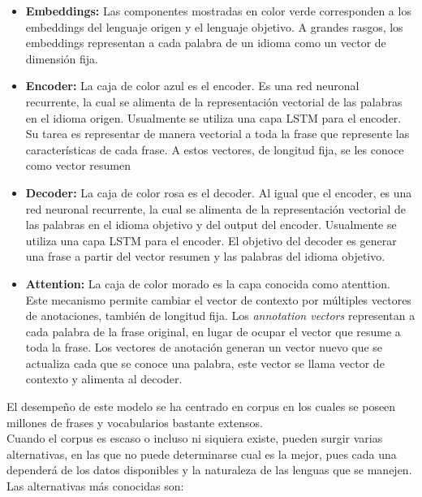 \documentclass[12pt,twocolumn, letterpaper]{article}
\begin{document}
\begin{itemize}
\item \textbf{Embeddings:} Las componentes mostradas en color verde corresponden a los embeddings del lenguaje origen y el lenguaje objetivo. A grandes rasgos, los embeddings representan a cada palabra de un idioma como un vector de dimensión fija.
\item \textbf{Encoder:} La caja de color azul es el encoder. Es una red neuronal recurrente, la cual se alimenta de la representación vectorial de las palabras en el idioma origen. Usualmente se utiliza una capa LSTM para el encoder. Su tarea es representar de manera vectorial a toda la frase que represente las características de cada frase. A estos vectores, de longitud fija, se les conoce como vector resumen

\item \textbf{Decoder:} La caja de color rosa es el decoder. Al igual que el encoder, es una red neuronal recurrente, la cual se alimenta de la representación vectorial de las palabras en el idioma objetivo y del output del encoder. Usualmente se utiliza una capa LSTM para el encoder. El objetivo del decoder es generar una frase a partir del vector resumen y las palabras del idioma objetivo.

\item \textbf{Attention:} La caja de color morado es la capa conocida como atenttion. Este mecanismo permite cambiar el vector de contexto por múltiples vectores de anotaciones, también de longitud fija. Los \emph{annotation vectors} representan a cada palabra de la frase original, en lugar de ocupar el vector que resume a toda la frase. Los vectores de anotación generan un vector nuevo que se actualiza cada que se conoce una palabra, este vector se llama vector de contexto y alimenta al decoder.

\end{itemize}

El desempeño de este modelo se ha centrado en corpus en los cuales se poseen millones de frases y vocabularios bastante extensos.\\

Cuando el corpus es escaso o incluso ni siquiera existe, pueden surgir varias alternativas, en las que no puede determinarse cual es la mejor, pues cada una dependerá de los datos disponibles y la naturaleza de las lenguas que se manejen.\\

Las alternativas más conocidas son:
\end{document}
